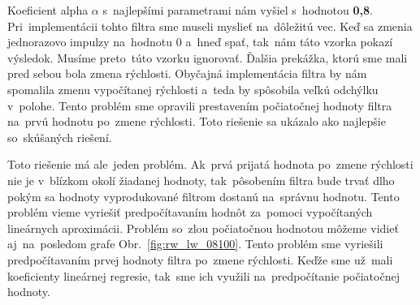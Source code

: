Koeficient alpha $\alpha$ s~najlepšími parametrami nám vyšiel s~hodnotou \textbf{0,8}. Pri~implementácii tohto filtra
sme museli myslieť na~dôležitú vec. Keď sa zmenia jednorazovo impulzy na~hodnotu 0 a~hneď spať, tak~nám táto vzorka
pokazí výsledok. Musíme preto~túto vzorku ignorovať. Ďalšia prekážka, ktorú sme mali pred sebou bola zmena rýchlosti.
Obyčajná implementácia filtra by nám spomalila zmenu vypočítanej rýchlosti a~teda by spôsobila veľkú odchýlku v~polohe.
Tento problém sme opravili prestavením počiatočnej hodnoty filtra na~prvú hodnotu po~zmene rýchlosti. Toto riešenie sa
ukázalo ako najlepšie so~skúšaných riešení.

Toto riešenie má ale~jeden problém. Ak~prvá prijatá hodnota po~zmene rýchlosti nie je v~blízkom okolí žiadanej
hodnoty, tak~pôsobením filtra bude trvať dlho pokým sa hodnoty vyprodukované filtrom dostanú na~správnu hodnotu.
Tento problém vieme vyriešiť predpočítavaním hodnôt za~pomoci vypočítaných lineárnych aproximácii. Problém so~zlou
počiatočnou hodnotou môžeme vidieť aj~na~posledom grafe Obr.~\ref{fig:rw_lw_08100}. Tento problém sme vyriešili
predpočítavaním prvej hodnoty filtra po~zmene rýchlosti. Keďže sme už~mali koeficienty lineárnej regresie, tak~sme
ich využili na~predpočítanie počiatočnej hodnoty.

\clearpage

